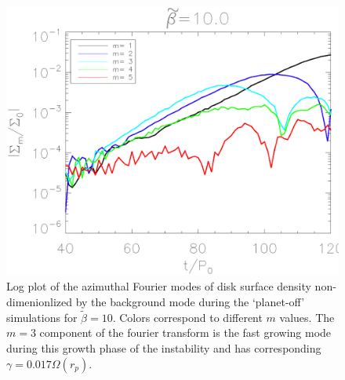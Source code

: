 \begin{figure}
  \includegraphics[width=\linewidth,clip=true,trim=1.2cm
    0cm 0cm 0cm]{figures/linear_stability}
  \caption{Log plot of the azimuthal Fourier modes of disk surface density non-dimenionlized by the background mode during the `planet-off' simulations for $\tilde{\beta}=10$. Colors correspond to different $m$ values. The $m=3$ component of the fourier transform is the fast growing mode during this growth phase of the instability and has corresponding $\gamma=0.017\Omega(r_p)$. \label{linearmodes}}
\end{figure}

